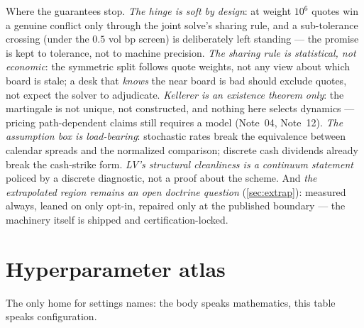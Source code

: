 \documentclass[11pt]{article}
\begin{document}
Where the guarantees stop.  \emph{The hinge is soft by design}: at
weight $10^{6}$ quotes win a genuine conflict only through the joint
solve's sharing rule, and a sub-tolerance crossing (under the $0.5$
vol bp screen) is deliberately left standing --- the promise is kept to
tolerance, not to machine precision.  \emph{The sharing rule is
statistical, not economic}: the symmetric split follows quote weights,
not any view about which board is stale; a desk that \emph{knows} the
near board is bad should exclude quotes, not expect the solver to
adjudicate.  \emph{Kellerer is an existence theorem only}: the
martingale is not unique, not constructed, and nothing here selects
dynamics --- pricing path-dependent claims still requires a model
(Note~04, Note~12).  \emph{The assumption box is load-bearing}:
stochastic rates break the equivalence between calendar spreads and
the normalized comparison; discrete cash dividends already break the
cash-strike form.  \emph{LV's structural cleanliness is a continuum
statement} policed by a discrete diagnostic, not a proof about the
scheme.  And \emph{the extrapolated region remains an open doctrine
question}
(\cref{sec:extrap}): measured always, leaned on only opt-in, repaired
only at the published boundary --- the machinery itself is shipped and
certification-locked.
\appendix
\section{Hyperparameter atlas}
\label{app:atlas}

The only home for settings names: the body speaks mathematics, this
table speaks configuration.
\end{document}

